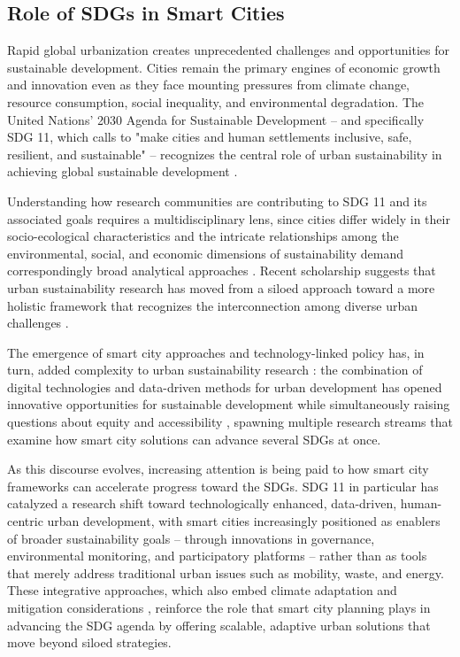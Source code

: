 \documentclass[journal]{IEEEtran}
\begin{document}
\subsection{Role of SDGs in Smart Cities}
Rapid global urbanization creates unprecedented challenges and opportunities for sustainable development. Cities remain the primary engines of economic growth and innovation even as they face mounting pressures from climate change, resource consumption, social inequality, and environmental degradation. The United Nations' 2030 Agenda for Sustainable Development -- and specifically SDG 11, which calls to "make cities and human settlements inclusive, safe, resilient, and sustainable" -- recognizes the central role of urban sustainability in achieving global sustainable development \cite{r114}.

Understanding how research communities are contributing to SDG 11 and its associated goals requires a multidisciplinary lens, since cities differ widely in their socio-ecological characteristics and the intricate relationships among the environmental, social, and economic dimensions of sustainability demand correspondingly broad analytical approaches \cite{r114}. Recent scholarship suggests that urban sustainability research has moved from a siloed approach toward a more holistic framework that recognizes the interconnection among diverse urban challenges \cite{r115}.

The emergence of smart city approaches and technology-linked policy has, in turn, added complexity to urban sustainability research \cite{r116}: the combination of digital technologies and data-driven methods for urban development has opened innovative opportunities for sustainable development while simultaneously raising questions about equity and accessibility \cite{r117}, spawning multiple research streams that examine how smart city solutions can advance several SDGs at once.

As this discourse evolves, increasing attention is being paid to how smart city frameworks can accelerate progress toward the SDGs. SDG 11 in particular has catalyzed a research shift toward technologically enhanced, data-driven, human-centric urban development, with smart cities increasingly positioned as enablers of broader sustainability goals -- through innovations in governance, environmental monitoring, and participatory platforms -- rather than as tools that merely address traditional urban issues such as mobility, waste, and energy. These integrative approaches, which also embed climate adaptation and mitigation considerations \cite{r118,r119}, reinforce the role that smart city planning plays in advancing the SDG agenda by offering scalable, adaptive urban solutions that move beyond siloed strategies.
\end{document}
